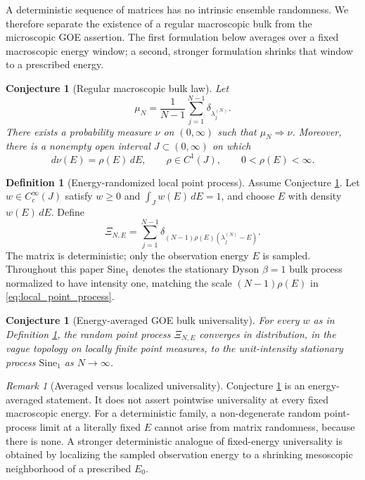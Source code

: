 \documentclass[11pt]{amsart}
\numberwithin{equation}{section}
\theoremstyle{plain}
\newtheorem{conjecture}[theorem]{Conjecture}
\theoremstyle{definition}
\newtheorem{definition}[theorem]{Definition}
\theoremstyle{remark}
\newtheorem{remark}[theorem]{Remark}
\begin{document}
A deterministic sequence of matrices has no intrinsic ensemble randomness.  We therefore separate the existence of a regular macroscopic bulk from the microscopic GOE assertion.  The first formulation below averages over a fixed macroscopic energy window; a second, stronger formulation shrinks that window to a prescribed energy.

\begin{conjecture}[Regular macroscopic bulk law]
\label{conj:bulk_density}
Let
\begin{equation}
\mu_N=\frac{1}{N-1}\sum_{j=1}^{N-1}\delta_{\lambda_j^{(N)}}.
\label{eq:empirical_spectral_measure}
\end{equation}
There exists a probability measure $\nu$ on $(0,\infty)$ such that $\mu_N\Rightarrow\nu$.  Moreover, there is a nonempty open interval $J\subset(0,\infty)$ on which
\begin{equation}
d\nu(E)=\rho(E)\,dE,
\qquad
\rho\in C^1(J),
\qquad
0<\rho(E)<\infty.
\label{eq:regular_bulk_density}
\end{equation}
\end{conjecture}

\begin{definition}[Energy-randomized local point process]
\label{def:energy_randomized_process}
Assume Conjecture \ref{conj:bulk_density}.  Let $w\in C_c^\infty(J)$ satisfy $w\ge0$ and $\int_Jw(E)\,dE=1$, and choose $E$ with density $w(E)\,dE$.  Define
\begin{equation}
\Xi_{N,E}
=
\sum_{j=1}^{N-1}
\delta_{(N-1)\rho(E)(\lambda_j^{(N)}-E)}.
\label{eq:local_point_process}
\end{equation}
The matrix is deterministic; only the observation energy $E$ is sampled.  Throughout this paper $\mathrm{Sine}_1$ denotes the stationary Dyson $\beta=1$ bulk process normalized to have intensity one, matching the scale $(N-1)\rho(E)$ in \eqref{eq:local_point_process}.
\end{definition}

\begin{conjecture}[Energy-averaged GOE bulk universality]
\label{conj:goe_bulk_universality}
For every $w$ as in Definition \ref{def:energy_randomized_process}, the random point process $\Xi_{N,E}$ converges in distribution, in the vague topology on locally finite point measures, to the unit-intensity stationary process $\mathrm{Sine}_1$ as $N\to\infty$.
\end{conjecture}

\begin{remark}[Averaged versus localized universality]
\label{rem:averaged_vs_fixed_energy}
Conjecture \ref{conj:goe_bulk_universality} is an energy-averaged statement.  It does not assert pointwise universality at every fixed macroscopic energy.  For a deterministic family, a non-degenerate random point-process limit at a literally fixed $E$ cannot arise from matrix randomness, because there is none.  A stronger deterministic analogue of fixed-energy universality is obtained by localizing the sampled observation energy to a shrinking mesoscopic neighborhood of a prescribed $E_0$.
\end{remark}
\end{document}
